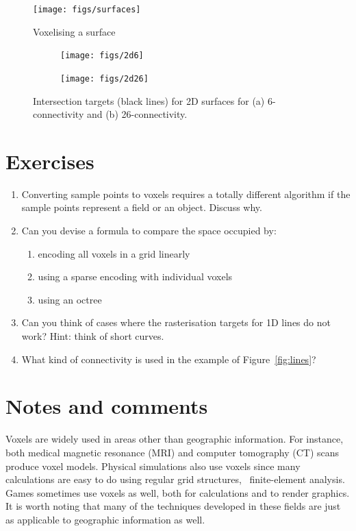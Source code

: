 \begin{figure}
\centering
\texttt{[image: figs/surfaces]}
\caption{Voxelising a surface}%
\label{fig:surfaces}
\end{figure}

\begin{figure}
\centering
\begin{subfigure}[b]{0.45\linewidth}
\texttt{[image: figs/2d6]}
\caption{}%
\label{subfig:2d6}
\end{subfigure}
\quad
\begin{subfigure}[b]{0.45\linewidth}
\texttt{[image: figs/2d26]}
\caption{}%
\label{subfig:2d26}
\end{subfigure}
\caption[Intersection targets for 2D surfaces for 6-connectivity and 26-connectivity]{Intersection targets (black lines) for 2D surfaces for (a) 6-connectivity and (b) 26-connectivity.}%
\label{fig:2d}
\end{figure}

%
\section{Exercises}

\begin{enumerate}
	\item Converting sample points to voxels requires a totally different algorithm if the sample points represent a field or an object. Discuss why.
	\item Can you devise a formula to compare the space occupied by:
	\begin{enumerate}
		\item encoding all voxels in a grid linearly
		\item using a sparse encoding with individual voxels
		\item using an octree
	\end{enumerate}
	\item Can you think of cases where the rasterisation targets for 1D lines do not work? Hint: think of short curves.
	\item What kind of connectivity is used in the example of Figure~\ref{fig:lines}?
\end{enumerate}



%
\section{Notes and comments}

Voxels are widely used in areas other than geographic information.
For instance, both medical magnetic resonance (MRI) and computer tomography (CT) scans produce voxel models.
Physical simulations also use voxels since many calculations are easy to do using regular grid structures, \eg\ finite-element analysis.
Games sometimes use voxels as well, both for calculations and to render graphics.
It is worth noting that many of the techniques developed in these fields are just as applicable to geographic information as well.

